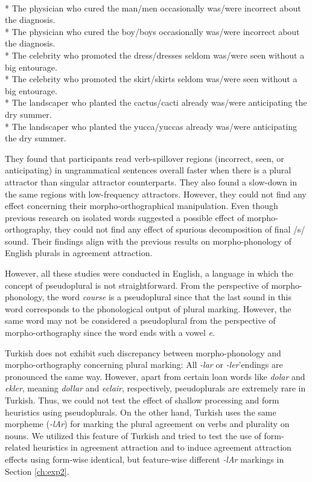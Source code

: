 \ea \label{ex:brehm}
    \\* The {physician} who cured the {man/men} occasionally was/were incorrect about the diagnosis.
    \\* The {physician} who cured the {boy/boys} occasionally was/were incorrect about the diagnosis.
    \\* The {celebrity} who promoted the {dress/dresses} seldom was/were seen without a big entourage.
    \\* The {celebrity} who promoted the {skirt/skirts} seldom was/were seen without a big entourage.
    \\* The {landscaper} who planted the {cactus/cacti} already was/were anticipating the dry summer.
    \\* The {landscaper} who planted the {yucca/yuccas} already was/were anticipating the dry summer.
    \z
\z

They found that participants read verb-spillover regions (incorrect, seen, or anticipating) in ungrammatical sentences overall faster when there is a plural attractor than singular attractor counterparts. They also found a slow-down in the same regions with low-frequency attractors. However, they could not find any effect concerning their morpho-orthographical manipulation. Even though previous research on isolated words suggested a possible effect of morpho-orthography, they could not find any effect of spurious decomposition of final /s/ sound. Their findings align with the previous results on morpho-phonology of English plurals in agreement attraction.

However, all these studies were conducted in English, a language in which the concept of pseudoplural is not straightforward. From the perspective of morpho-phonology, the word \emph{course} is a pseudoplural since that the last sound in this word corresponds to the phonological output of plural marking. However, the same word may not be considered a pseudoplural from the perspective of morpho-orthography since the word ends with a vowel \emph{e}.

Turkish does not exhibit such discrepancy between morpho-phonology and morpho-orthography concerning plural marking: All \emph{-lar} or \emph{-ler}'endings are pronounced the same way. However, apart from certain loan words like \emph{dolar} and \emph{ekler}, meaning \emph{dollar} and \emph{eclair}, respectively, pseudoplurals are extremely rare in Turkish. Thus, we could not test the effect of shallow processing and form heuristics using pseudoplurals. On the other hand, Turkish uses the same morpheme (\emph{-lAr}) for marking the plural agreement on verbs and plurality on nouns. We utilized this feature of Turkish and tried to test the use of form-related heuristics in agreement attraction and to induce agreement attraction effects using form-wise identical, but feature-wise different \emph{-lAr} markings in Section \ref{ch:exp2}. 


